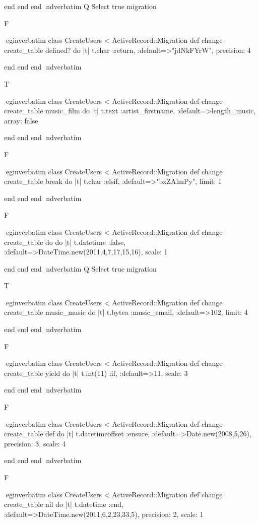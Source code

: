     end 
  end 
end
nd{verbatim}
Q
 Select true migration

F

egin{verbatim}
 class CreateUsers < ActiveRecord::Migration 
  def change 
    create_table defined? do |t| 
      t.char :return, :default=>"jdNkFYrW", precision: 4
    
    end 
  end 
end
nd{verbatim}

T

egin{verbatim}
 class CreateUsers < ActiveRecord::Migration 
  def change 
    create_table music_film do |t| 
      t.text :artist_firstname, :default=>length_music, array: false
    
    end 
  end 
end
nd{verbatim}

F

egin{verbatim}
 class CreateUsers < ActiveRecord::Migration 
  def change 
    create_table break do |t| 
      t.char :elsif, :default=>"bxZAlmPy", limit: 1
    
    end 
  end 
end
nd{verbatim}

F

egin{verbatim}
 class CreateUsers < ActiveRecord::Migration 
  def change 
    create_table do do |t| 
      t.datetime :false, :default=>DateTime.new(2011,4,7,17,15,16), scale: 1
    
    end 
  end 
end
nd{verbatim}
Q
 Select true migration

T

egin{verbatim}
 class CreateUsers < ActiveRecord::Migration 
  def change 
    create_table music_music do |t| 
      t.bytea :music_email, :default=>102, limit: 4
    
    end 
  end 
end
nd{verbatim}

F

egin{verbatim}
 class CreateUsers < ActiveRecord::Migration 
  def change 
    create_table yield do |t| 
      t.int(11) :if, :default=>11, scale: 3
    
    end 
  end 
end
nd{verbatim}

F

egin{verbatim}
 class CreateUsers < ActiveRecord::Migration 
  def change 
    create_table def do |t| 
      t.datetimeoffset :ensure, :default=>Date.new(2008,5,26), precision: 3, scale: 4
    
    end 
  end 
end
nd{verbatim}

F

egin{verbatim}
 class CreateUsers < ActiveRecord::Migration 
  def change 
    create_table nil do |t| 
      t.datetime :end, :default=>DateTime.new(2011,6,2,23,33,5), precision: 2, scale: 1
    
